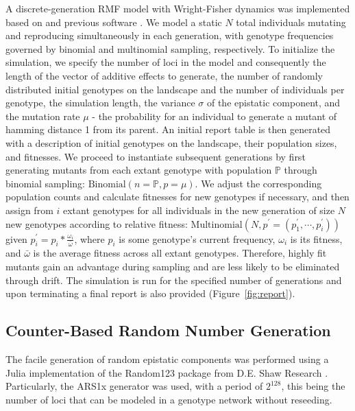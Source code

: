 \documentclass[paper=a4, fontsize=11pt,twoside]{scrartcl}       %
\begin{document}
A discrete-generation RMF model with Wright-Fisher dynamics was implemented based on \cite{liRapidAdaptationRecombining2024} and previous software \cite{amadoSTUNForwardtimeSimulation2023}. We model a static $N$ total individuals mutating and reproducing simultaneously in each generation, with genotype frequencies governed by binomial and multinomial sampling, respectively. To initialize the simulation, we specify the number of loci in the model and consequently the length of the vector of additive effects to generate, the number of randomly distributed initial genotypes on the landscape and the number of individuals per genotype, the simulation length, the variance $\sigma$ of the epistatic component, and the mutation rate $\mu$ - the probability for an individual to generate a mutant of hamming distance 1 from its parent. An initial report table is then generated with a description of initial genotypes on the landscape, their population sizes, and fitnesses. We proceed to instantiate subsequent generations by first generating mutants from each extant genotype with population $\mathbb{P}$ through binomial sampling: $\text{Binomial}(n = \mathbb{P}, p = \mu)$. We adjust the corresponding population counts and calculate fitnesses for new genotypes if necessary, and then assign from $i$ extant genotypes for all individuals in the new generation of size $N$ new genotypes according to relative fitness: $\text{Multinomial}(N, p^{\prime} = (p^{\prime}_1, \cdots, p^{\prime}_i))$ given $p^{\prime}_i = p_i * \frac{\omega_i}{\bar{\omega}}$, where $p_i$ is some genotype's current frequency, $\omega_i$ is its fitness, and $\bar{\omega}$ is the average fitness across all extant genotypes. Therefore, highly fit mutants gain an advantage during sampling and are less likely to be eliminated through drift. The simulation is run for the specified number of generations and upon terminating a final report is also provided (Figure~\ref{fig:report}).

\subsection*{Counter-Based Random Number Generation}

The facile generation of random epistatic components was performed using a Julia implementation \cite{JuliaRandomRandom123jl2024} of the Random123 package from D.E. Shaw Research \cite{salmonParallelRandomNumbers2011}. Particularly, the ARS1x generator was used, with a period of $2^{128}$, this being the number of loci that can be modeled in a genotype network without reseeding.
\end{document}
